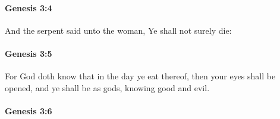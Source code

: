 
		\paragraph{Genesis 3:4} %
			\label{GENESIS-3-4}

			And the serpent said unto the woman, Ye shall not surely die:


		\paragraph{Genesis 3:5} %
			\label{GENESIS-3-5}

			For God doth know that in the day ye eat thereof, then your eyes shall be opened, and ye shall be as gods, knowing good and evil.


		\paragraph{Genesis 3:6} %
			\label{GENESIS-3-6}

